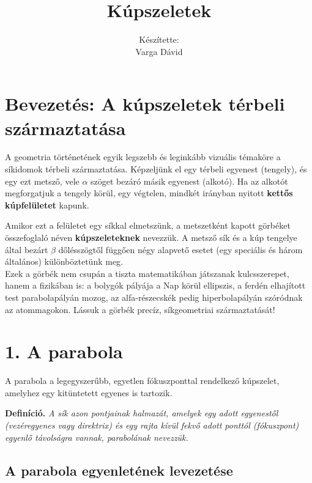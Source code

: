 \documentclass[12pt, a4paper]{article}
\author{}
\newcommand{\textbfr}[1]{\textbf{\textcolor{bvred}{#1}}}
\begin{document}
\title{\textbfr{Kúpszeletek}}
\author{Készítette:\\Varga Dávid}
\date{}
\maketitle

\section*{Bevezetés: A kúpszeletek térbeli származtatása}

A geometria történetének egyik legszebb és leginkább vizuális témaköre a síkidomok térbeli származtatása. Képzeljünk el egy térbeli egyenest (tengely), és egy ezt metsző, vele $\alpha$ szöget bezáró másik egyenest (alkotó). Ha az alkotót megforgatjuk a tengely körül, egy végtelen, mindkét irányban nyitott \textbfr{kettős kúpfelületet} kapunk. 

Amikor ezt a felületet egy síkkal elmetszünk, a metszetként kapott görbéket összefoglaló néven \textbfr{kúpszeleteknek} nevezzük. A metsző sík és a kúp tengelye által bezárt $\beta$ dőlésszögtől függően négy alapvető esetet (egy speciális és három általános) különböztetünk meg. \\



Ezek a görbék nem csupán a tiszta matematikában játszanak kulcsszerepet, hanem a fizikában is: a bolygók pályája a Nap körül ellipszis, a ferdén elhajított test parabolapályán mozog, az alfa-részecskék pedig hiperbolapályán szóródnak az atommagokon. Lássuk a görbék precíz, síkgeometriai származtatását!

\section*{1. A parabola}

A parabola a legegyszerűbb, egyetlen fókuszponttal rendelkező kúpszelet, amelyhez egy kitüntetett egyenes is tartozik.

\textbf{Definíció.} \textit{A sík azon pontjainak halmazát, amelyek egy adott egyenestől (vezéregyenes vagy direktrix) és egy rajta kívül fekvő adott ponttól (fókuszpont) egyenlő távolságra vannak, \textcolor{bvred}{parabolának} nevezzük.}

\subsection*{A parabola egyenletének levezetése}
\end{document}
